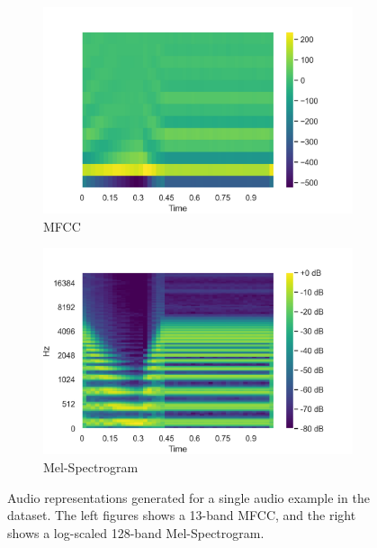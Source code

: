 \begin{figure}[ht]
    \centering
    \begin{subfigure}[b]{0.45\textwidth}
        \centering
        \includegraphics[width=\textwidth]{figures/inverse-synth/features_mfcc_example.png}
        \caption{MFCC}
    \end{subfigure}
    \begin{subfigure}[b]{0.45\textwidth}
        \centering
        \includegraphics[width=\textwidth]{figures/inverse-synth/features_mel_example.png}
        \caption{Mel-Spectrogram}
    \end{subfigure}
    \caption{Audio representations generated for a single audio example in the dataset. The left figures shows a 13-band MFCC, and the right shows a log-scaled 128-band Mel-Spectrogram.}
    \label{fig:mfcc-mel-representations}
\end{figure}

